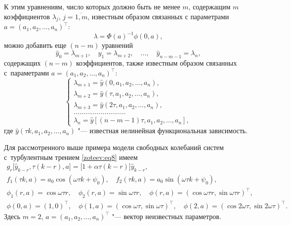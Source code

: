 К этим уравнениям, число которых должно быть не менее $m$, содержащим $m$ коэффициентов $\lambda_j$, $j=\overline{1,m}$, известным образом связанных с параметрами $a=(a_1,a_2,\dots,a_n)^{\top}$: $$
\lambda=\Phi(a)^{-1}\phi(0,a),
$$ можно добавить еще $(n-m)$  уравнений 
$$\hat{y}_0=\lambda_{m+1},\quad  \hat{y}_1=\lambda_{m+2},\quad \dots,\quad  \hat{y}_{n-m-1}=\lambda_n,
$$ 
содержащих $(n-m)$ коэффициентов, также известным образом связанных с~параметрами $a=(a_1,a_2,\dots,a_n)^{\top}$: 
$$
\left\{
\begin{array}{l}
{\lambda_{m+1}=\hat{y}(0,a_1,a_2,\dots,a_n),} \\
{\lambda_{m+2}=\hat{y}(\tau,a_1,a_2,\dots,a_n),} \\
{\lambda_{m+3}=\hat{y}(2\tau,a_1,a_2,\dots,a_n),}\\
{\dots\dots\dots\dots\dots\dots\dots\dots\dots} \\
{\lambda_n=\hat{y}[(n-m-1)\tau,a_1,a_2,\dots,a_n],}
\end{array}
\right.
$$
где $\hat{y}(\tau k,a_1,a_2,\dots,a_n)$ "--- известная нелинейная функциональная зависимость.

Для рассмотренного выше примера модели свободных колебаний систем с~турбулентным трением \eqref{zoteev:eq8}  имеем 
\begin{gather}
g_r\big[\hat{y}_{k-r},\tau(k-r),a\big]=\big[1+\alpha\tau(k-r)\big]\hat{y}_{k-r} , 
\\
f_1(\tau k,a)=a_0\cos(\omega\tau k+\psi_0), \quad f_2(\tau k,a)=a_0\sin(\omega\tau k+\psi_0),
\\
\phi_1(r,a)=\cos\omega\tau r, \quad \phi_2(r,a)=\sin\omega\tau r, \quad \phi(r,a)=(\cos\omega\tau r,\sin\omega\tau r)^{\top},
\\
\phi(0,a)=(1,0)^{\top}, \quad \phi(1,a)=(\cos\omega\tau,\sin\omega\tau)^{\top}, \quad     \phi(2,a)=(\cos2\omega\tau,\sin2\omega\tau)^{\top} .
\end{gather}
Здесь $m=2$,
$a=(a_1,a_2,\dots,a_n)^{\top}$ "--- вектор неизвестных параметров.

